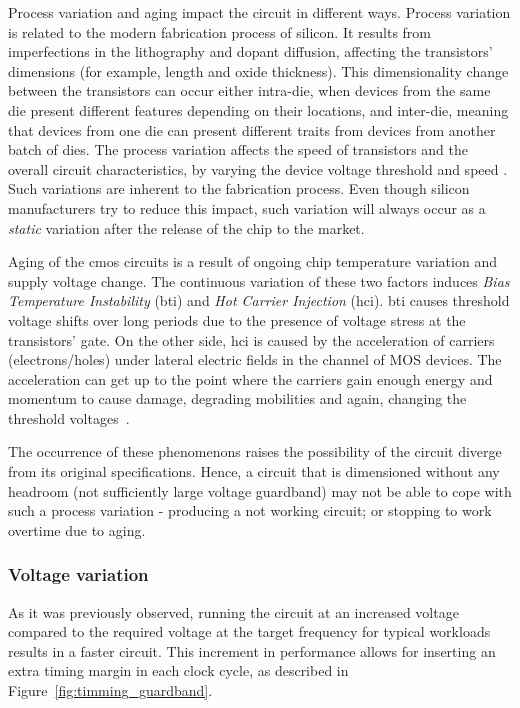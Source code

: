 Process variation and aging impact the circuit in different ways. Process variation is related to the modern fabrication process of silicon. It results from imperfections in the lithography and dopant diffusion, affecting the transistors' dimensions (for example, length and oxide thickness). This dimensionality change between the transistors can occur either intra-die, when devices from the same die present different features depending on their locations, and inter-die, meaning that devices from one die can present different traits from devices from another batch of dies. The process variation affects the speed of transistors and the overall circuit characteristics, by varying the device voltage threshold and speed \cite{schemmert_threshold-voltage_1974, thomas_core_2016}. Such variations are inherent to the fabrication process. Even though silicon manufacturers try to reduce this impact, such variation will always occur as a \textit{static} variation after the release of the chip to the market.

Aging of the \acrshort{cmos} circuits is a result of ongoing chip temperature variation and supply voltage change. The continuous variation of these two factors induces \textit{Bias Temperature Instability} (\acrshort{bti}) and  \textit{Hot Carrier Injection} (\acrshort{hci}). \acrshort{bti} causes threshold voltage shifts over long periods due to the presence of voltage stress at the transistors' gate. On the other side, \acrshort{hci} is caused by the acceleration of carriers (electrons/holes) under lateral electric fields in the channel of MOS devices. The acceleration can get up to the point where the carriers gain enough energy and momentum to cause damage, degrading mobilities and again, changing the threshold voltages~\cite{sapatnekar_what_nodate}.

The occurrence of these phenomenons raises the possibility of the circuit diverge from its original specifications. Hence, a circuit that is dimensioned without any headroom (not sufficiently large voltage guardband) may not be able to cope with such a process variation - producing a not working circuit; or stopping to work overtime due to aging.



\subsubsection{Voltage variation}

As it was previously observed, running the circuit at an increased voltage compared to the required voltage at the target frequency for typical workloads results in a faster circuit. This increment in performance allows for inserting an extra timing margin in each clock cycle, as described in Figure~\ref{fig:timming_guardband}. 

